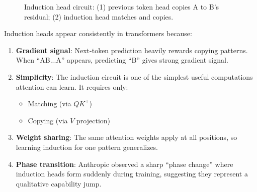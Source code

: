 \begin{figure}[h]
\centering
\caption{Induction head circuit: (1) previous token head copies A to B's residual; (2) induction head matches and copies.}
\end{figure}

\begin{remark}
    Induction heads appear consistently in transformers because:
    \begin{enumerate}
        \item \textbf{Gradient signal}: Next-token prediction heavily rewards copying patterns. When ``AB...A'' appears, predicting ``B'' gives strong gradient signal.

        \item \textbf{Simplicity}: The induction circuit is one of the simplest useful computations attention can learn. It requires only:
        \begin{itemize}
            \item Matching (via $QK^\top$)
            \item Copying (via $V$ projection)
        \end{itemize}

        \item \textbf{Weight sharing}: The same attention weights apply at all positions, so learning induction for one pattern generalizes.

        \item \textbf{Phase transition}: Anthropic observed a sharp ``phase change'' where induction heads form suddenly during training, suggesting they represent a qualitative capability jump.
    \end{enumerate}
\end{remark}


